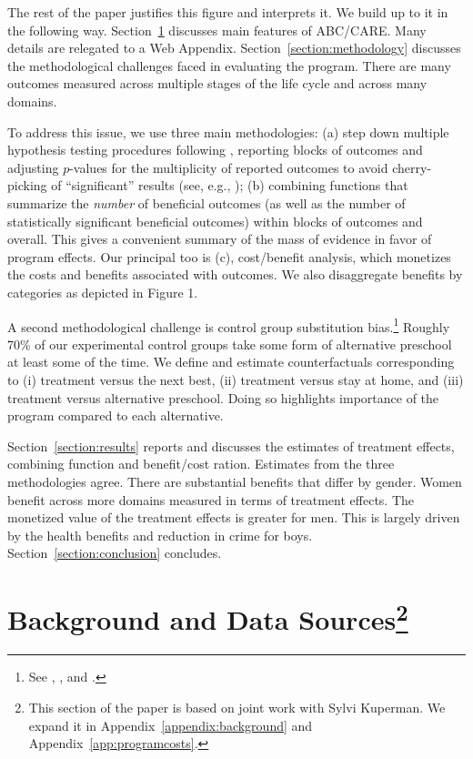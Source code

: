 The rest of the paper justifies this figure and interprets it. We build up to it in the following way. Section~\ref{section:background} discusses main features of ABC/CARE. Many details are relegated to a Web Appendix. Section~\ref{section:methodology} discusses the methodological challenges faced in evaluating the program. There are many outcomes measured across multiple stages of the life cycle and across many domains. 

To address this issue, we use three main methodologies: (a) step down multiple hypothesis testing procedures following \cite{Romano_Wolf_2005_JASA}, reporting blocks of outcomes and adjusting $p$-values for the multiplicity of reported outcomes to avoid cherry-picking of ``significant'' results (see, e.g., \citealp{Heckman_Moon_etal_2010_QE}); (b) combining functions that summarize the \emph{number} of beneficial outcomes (as well as the number of statistically significant beneficial outcomes) within blocks of outcomes and overall. This gives a convenient summary of the mass of evidence in favor of program effects. Our principal too is (c), cost/benefit analysis, which monetizes the costs and benefits associated with outcomes. We also disaggregate benefits by categories as depicted in Figure 1. 

A second methodological challenge is control group substitution bias.\footnote{See \cite{Heckman_1992_randomization}, \cite{Heckman_Hohmann_etal_2000_QJE}, and \cite{Kline-Walters_2016_QJE}.} Roughly 70\% of our experimental control groups take some form of alternative preschool at least some of the time. We define and estimate counterfactuals corresponding to (i) treatment versus the next best, (ii) treatment versus stay at home, and (iii) treatment versus alternative preschool. Doing so highlights importance of the program compared to each alternative. 

Section~\ref{section:results} reports and discusses the estimates of treatment effects, combining function and benefit/cost ration. Estimates from the three methodologies agree. There are substantial benefits that differ by gender. Women benefit across more domains measured in terms of treatment effects. The monetized value of the treatment effects is greater for men. This is largely driven by the health benefits and reduction in crime for boys. Section~\ref{section:conclusion} concludes.

\section[Background and Data Sources]{Background and Data Sources\footnote{This section of the paper is based on joint work with Sylvi Kuperman. We expand it  in Appendix~\ref{appendix:background} and Appendix~\ref{app:programcosts}.}} \label{section:background}

